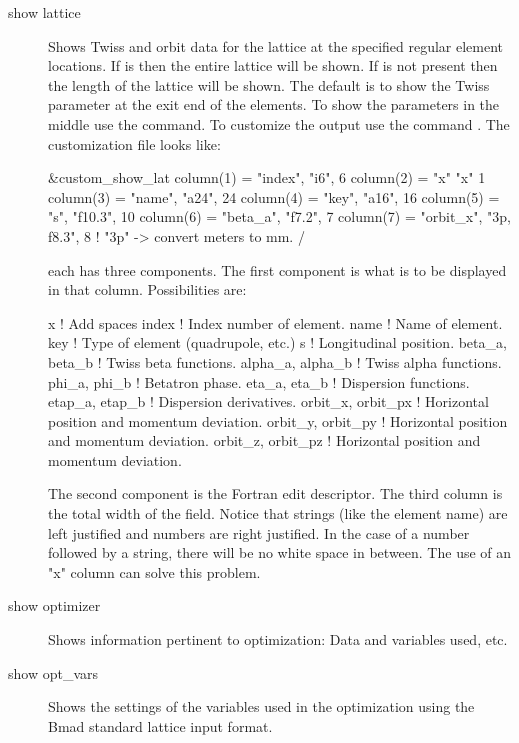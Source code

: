 {{\begin{description}
  \item[show lattice]
Shows Twiss and orbit data for the  lattice at the specified
regular element locations. If  is  then the
entire lattice will be shown. If  is not present then
the length of the lattice will be shown. The default is to show the Twiss
parameter at the exit end of the elements. To show the parameters in the 
middle use the  command. To customize the output
use the command . The customization
file looks like:
\begin{example}
  &custom_show_lat
    column(1) = "index",   "i6",     6 
    column(2) = "x"        "x"       1
    column(3) = "name",    "a24",   24
    column(4) = "key",     "a16",   16
    column(5) = "s",       "f10.3", 10
    column(6) = "beta_a",  "f7.2",   7
    column(7) = "orbit_x", "3p, f8.3", 8   ! "3p" -> convert meters to mm.
  /
\end{example}
each  has three components. The first component is what is to be 
displayed in that column. Possibilities are:
\begin{example}
  x                  ! Add spaces
  index              ! Index number of element.
  name               ! Name of element.
  key                ! Type of element (quadrupole, etc.)
  s                  ! Longitudinal position.
  beta_a,  beta_b    ! Twiss beta functions.
  alpha_a, alpha_b   ! Twiss alpha functions.
  phi_a,   phi_b     ! Betatron phase.
  eta_a,   eta_b     ! Dispersion functions.
  etap_a,  etap_b    ! Dispersion derivatives.
  orbit_x, orbit_px  ! Horizontal position and momentum deviation.
  orbit_y, orbit_py  ! Horizontal position and momentum deviation.
  orbit_z, orbit_pz  ! Horizontal position and momentum deviation.
\end{example}
The second component is the Fortran edit descriptor. The third column is the total
width of the field. Notice that strings (like the element name) are left justified and
numbers are right justified. In the case of a number followed by a string, 
there will be no white space in between. The use of an "x" column can solve this problem.

  \item[show optimizer]
Shows information pertinent to optimization: Data and variables used, etc.

  \item[show opt\_vars]
Shows the settings of the variables used in the optimization using the 
Bmad standard lattice input format.


\end{description}}}

